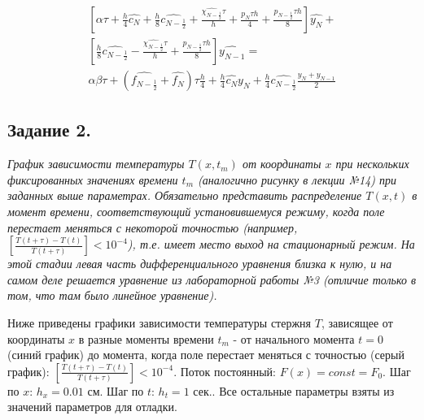 \documentclass[a4paper,12pt]{article}
\begin{document}
	\begin{eqnarray}
	\left[
	\alpha \tau + \frac{h}{4} \widehat{c_N} + \frac{h}{8} \widehat{c_{N - \frac{1}{2}}} + \frac{\widehat{\chi_{N - \frac{1}{2}}} \tau}{h} + \frac{p_N \tau h}{4} + \frac{p_{N - \frac{1}{2}} \tau h}{8}
	\right] \widehat{y_N} +\nonumber\\ 
	\left[
	\frac{h}{8}\widehat{c_{N - \frac{1}{2}}} - \frac{\widehat{\chi_{N - \frac{1}{2}}} \tau}{h} + \frac{p_{N - \frac{1}{2}} \tau h}{8}
	\right] \widehat{y_{N-1}} =\nonumber\\
	\alpha \beta \tau + (\widehat{f_{N - \frac{1}{2}}} + \widehat{f_N})\tau \frac{h}{4} + \frac{h}{4} \widehat{c_N} y_N + \frac{h}{4} \widehat{c_{N - \frac{1}{2}}} \frac{y_N + y_{N - 1}}{2}\nonumber
	\end{eqnarray}
	
	
	
	\newpage
	
	\subsection*{Задание 2.}
	
	\textit{График зависимости температуры $T(x, t_m)$ от координаты $x$ при нескольких фиксированных значениях времени $t_m$ (аналогично рисунку в лекции №14) при заданных выше параметрах. Обязательно представить распределение $T(x, t)$ в момент времени, соответствующий установившемуся режиму, когда поле перестает меняться с некоторой точностью (например, $\left[\frac{T(t + \tau) - T(t)}{T(t + \tau)}\right] < 10^{-4}$), т.е. имеет место выход на стационарный режим. На этой стадии левая часть дифференциального уравнения близка к нулю, и на самом деле решается уравнение из лабораторной работы №3 (отличие только в том, что там было линейное уравнение).}
	
	
	Ниже приведены графики зависимости температуры стержня $T$, зависящее от координаты $x$ в разные моменты времени $t_m$ - от начального момента $t = 0$ (синий график) до момента, когда поле перестает меняться с точностью (серый график): $\left[\frac{T(t + \tau) - T(t)}{T(t + \tau)}\right] < 10^{-4}$. Поток постоянный: $F(x) = const = F_0$. Шаг по $x$: $h_x = 0.01$ см. Шаг по $t$: $h_t = 1$ сек.. Все остальные параметры взяты из значений параметров для отладки.
	
\end{document}
